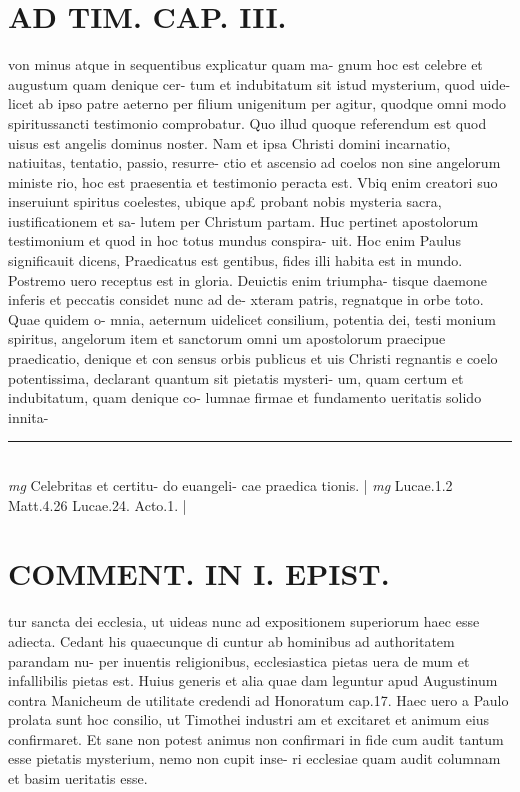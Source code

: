 \documentclass{article}
\begin{document}
\begin{pages}
\section*{AD TIM. CAP. III. }
\marginpar{[ p.136 ]}\pstart von minus atque in sequentibus explicatur quam ma- gnum hoc est celebre et augustum quam denique cer- tum et indubitatum sit istud mysterium, quod uide- licet ab ipso patre aeterno per filium unigenitum per agitur, quodque omni modo spiritussancti testimonio comprobatur. Quo illud quoque referendum est quod uisus est angelis dominus noster. Nam et ipsa Christi domini incarnatio, natiuitas, tentatio, passio, resurre- ctio et ascensio ad coelos non sine angelorum ministe rio, hoc est praesentia et testimonio peracta est. Vbiq enim creatori suo inseruiunt spiritus coelestes, ubique ap£ probant nobis mysteria sacra, iustificationem et sa- lutem per Christum partam. Huc pertinet apostolorum testimonium et quod in hoc totus mundus conspira- uit. Hoc enim Paulus significauit dicens, Praedicatus est gentibus, fides illi habita est in mundo. Postremo uero receptus est in gloria. Deuictis enim triumpha- tisque daemone inferis et peccatis considet nunc ad de- xteram patris, regnatque in orbe toto. Quae quidem o- mnia, aeternum uidelicet consilium, potentia dei, testi monium spiritus, angelorum item et sanctorum omni um apostolorum praecipue praedicatio, denique et con sensus orbis publicus et uis Christi regnantis e coelo potentissima, declarant quantum sit pietatis mysteri- um, quam certum et indubitatum, quam denique co- lumnae firmae et fundamento ueritatis solido innita-  \pend
\vspace{0.5cm}\noindent
\vspace{0.2cm}\rule{1cm}{0.2pt}\\ 
\hspace{0.2cm}\textit{mg}
\footnotesize Celebritas et certitu- do euangeli- cae praedica tionis. 
\normalsize| 
\hspace{0.2cm}\textit{mg}
\footnotesize Lucae.1.2 Matt.4.26 Lucae.24. Acto.1. 
\normalsize| 
\section*{COMMENT. IN I. EPIST. }\pstart tur sancta dei ecclesia, ut uideas nunc ad expositionem superiorum haec esse adiecta. Cedant his quaecunque di cuntur ab hominibus ad authoritatem parandam nu- per inuentis religionibus, ecclesiastica pietas uera de mum et infallibilis pietas est. Huius generis et alia quae dam leguntur apud Augustinum contra Manicheum de utilitate credendi ad Honoratum cap.17. Haec uero a Paulo prolata sunt hoc consilio, ut Timothei industri am et excitaret et animum eius confirmaret. Et sane non potest animus non confirmari in fide cum audit tantum esse pietatis mysterium, nemo non cupit inse- ri ecclesiae quam audit columnam et basim ueritatis esse.  \pend
{}
{}

\end{pages}
\end{document}
